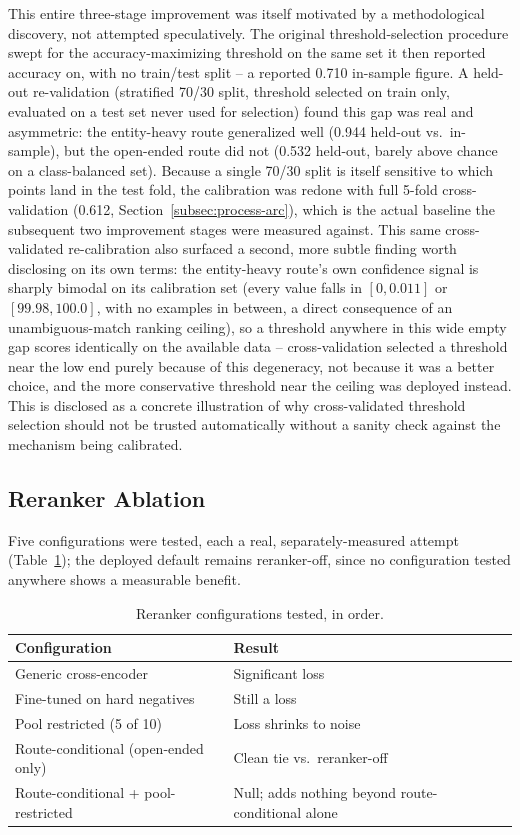 \documentclass[a4paper,twoside]{article}
\begin{document}
This entire three-stage improvement was itself motivated by a methodological discovery, not attempted speculatively. The original threshold-selection procedure swept for the accuracy-maximizing threshold on the same set it then reported accuracy on, with no train/test split -- a reported 0.710 in-sample figure. A held-out re-validation (stratified 70/30 split, threshold selected on train only, evaluated on a test set never used for selection) found this gap was real and asymmetric: the entity-heavy route generalized well (0.944 held-out vs.\ in-sample), but the open-ended route did not (0.532 held-out, barely above chance on a class-balanced set). Because a single 70/30 split is itself sensitive to which points land in the test fold, the calibration was redone with full 5-fold cross-validation (0.612, Section~\ref{subsec:process-arc}), which is the actual baseline the subsequent two improvement stages were measured against. This same cross-validated re-calibration also surfaced a second, more subtle finding worth disclosing on its own terms: the entity-heavy route's own confidence signal is sharply bimodal on its calibration set (every value falls in $[0, 0.011]$ or $[99.98, 100.0]$, with no examples in between, a direct consequence of an unambiguous-match ranking ceiling), so a threshold anywhere in this wide empty gap scores identically on the available data -- cross-validation selected a threshold near the low end purely because of this degeneracy, not because it was a better choice, and the more conservative threshold near the ceiling was deployed instead. This is disclosed as a concrete illustration of why cross-validated threshold selection should not be trusted automatically without a sanity check against the mechanism being calibrated.

\subsection{Reranker Ablation}
\label{subsec:results-reranker}

Five configurations were tested, each a real, separately-measured attempt (Table~\ref{tab:reranker-report}); the deployed default remains reranker-off, since no configuration tested anywhere shows a measurable benefit.

\begin{table}[h]
\caption{Reranker configurations tested, in order.}\label{tab:reranker-report}\centering
\begin{tabular}{|l|l|}
\hline
Configuration & Result \\
\hline
Generic cross-encoder & Significant loss \\
Fine-tuned on hard negatives & Still a loss \\
Pool restricted (5 of 10) & Loss shrinks to noise \\
Route-conditional (open-ended only) & Clean tie vs.\ reranker-off \\
Route-conditional + pool-restricted & Null; adds nothing beyond route-conditional alone \\
\hline
\end{tabular}
\end{table}
\end{document}
